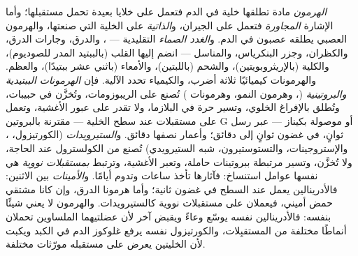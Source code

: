 \begin{definition}[الهرمون]\label{def:b3:endocrinology:hormone}
\emph{الهرمون} مادة تطلقها خلية في الدم فتعمل على خلايا
بعيدة تحمل مستقبلها؛ وأما الإشارة \emph{المجاورة} فتعمل على
الجيران، و\emph{الذاتية} على الخلية التي صنعتها، والهرمون
العصبي يطلقه عصبون في الدم. و\emph{الغدد الصماء} التقليدية
--- ، والدرق، وجارات الدرق، والكظران، وجزر البنكرياس،
والمناسل --- انضم إليها القلب (بالببتيد المدر للصوديوم)،
والكلية (بالإريثروبويتين)، والشحم (باللبتين)، والأمعاء
(باثني عشر ببتيدًا)، والعظم. والهرمونات كيميائيًا ثلاثة
أضرب، والكيمياء تحدد الآلية. فإن \emph{الهرمونات الببتيدية
والبروتينية} (، وهرمون النمو، وهرمونات )
تُصنع على الريبوزومات، وتُخزَّن في حبيبات، وتُطلق بالإفراغ
الخلوي، وتسير حرة في البلازما، ولا تقدر على عبور الأغشية،
وتعمل على مستقبلات عند سطح الخلية --- مقترنة بالبروتين G أو
موصولة بكيناز --- عبر رسل ثوانٍ، في غضون ثوانٍ إلى دقائق؛
وأعمار نصفها دقائق. و\emph{الستيرويدات} (الكورتيزول،
، والإستروجينات، والتستوستيرون،  شبه
الستيرويدي) تُصنع من الكولسترول عند الحاجة، ولا تُخزَّن،
وتسير مرتبطة ببروتينات حاملة، وتعبر الأغشية، وترتبط
\emph{بمستقبلات نووية} هي نفسها عوامل استنساخ: فآثارها تأخذ
ساعات وتدوم أيامًا. و\emph{الأمينات} بين الاثنين:
فالأدرينالين يعمل عند السطح في غضون ثانية؛ وأما هرمونا
الدرق، وإن كانا مشتقي حمض أميني، فيعملان على مستقبلات نووية
كالستيرويدات. والهرمون لا يعني شيئًا بنفسه: فالأدرينالين
نفسه يوسّع وعاءً ويقبض آخر لأن عضلتيهما الملساوين تحملان
أنماطًا مختلفة من المستقبِلات، والكورتيزول نفسه يرفع غلوكوز
الدم في الكبد ويكبت  لأن  الخليتين يعرض على
مستقبله مورّثات مختلفة.
\end{definition}

